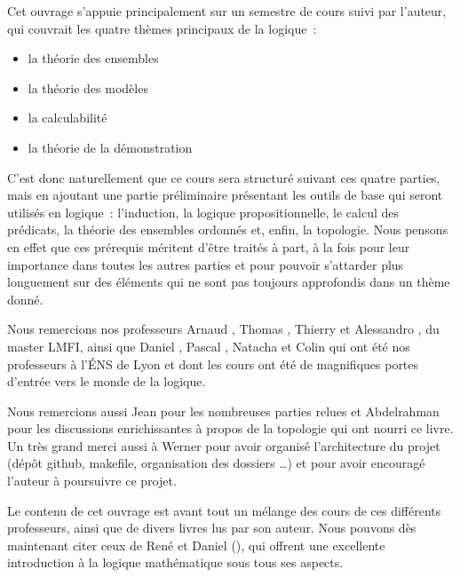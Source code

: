 Cet ouvrage s'appuie principalement sur un semestre de cours suivi par
l'auteur, qui couvrait les quatre thèmes principaux de la logique~:
\begin{itemize}
\item la théorie des ensembles
\item la théorie des modèles
\item la calculabilité
\item la théorie de la démonstration
\end{itemize}

C'est donc naturellement que ce cours sera structuré suivant ces quatre
parties, mais en ajoutant une partie préliminaire présentant les outils de base
qui seront utilisés en logique~: l'induction, la logique propositionnelle, le
calcul des prédicats, la théorie des ensembles ordonnés et, enfin, la topologie.
Nous pensons en effet que ces prérequis méritent d'être traités à part, à la
fois pour leur importance dans toutes les autres parties et pour pouvoir
s'attarder plus longuement sur des éléments qui ne sont pas toujours approfondis
dans un thème donné.

Nous remercions nos professeurs Arnaud , Thomas ,
Thierry  et Alessandro , du master LMFI, ainsi que
Daniel , Pascal , Natacha  et
Colin  qui ont été nos professeurs à l'\'ENS de Lyon et
dont les cours ont été de magnifiques portes d'entrée vers le monde de la
logique.

Nous remercions aussi Jean  pour les nombreuses parties relues et
Abdelrahman  pour les discussions enrichissantes à propos de la
topologie qui ont nourri ce livre. Un très grand merci aussi à Werner
 pour avoir organisé l'architecture du projet (dépôt github,
makefile, organisation des dossiers \ldots) et pour avoir encouragé l'auteur à
poursuivre ce projet.

Le contenu de cet ouvrage est avant tout un mélange des cours de ces différents
professeurs, ainsi que de divers livres lus par son auteur. Nous pouvons dès
maintenant citer ceux de René  et Daniel 
(\cite{Cori2003,Cori2020}), qui offrent une excellente
introduction à la logique mathématique sous tous ses aspects.
